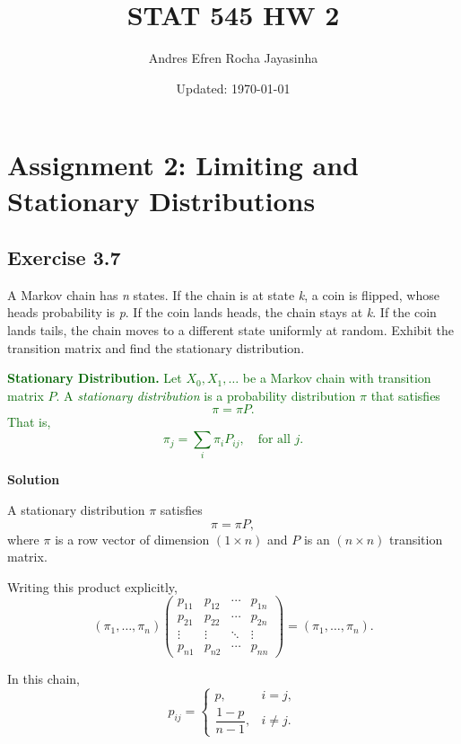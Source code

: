 \documentclass[hidelinks]{article}
\title{\textbf{STAT 545 HW 2}}
\author{Andres Efren Rocha Jayasinha}
\date{Updated: \today} %
\begin{document}
\hypersetup{bookmarksnumbered=true,}
\pagecolor{white}
\color{black}
\maketitle
\begin{Large}
\tableofcontents
\end{Large}%
\pagebreak

\section{Assignment 2: Limiting and Stationary Distributions}

\subsection{Exercise 3.7}
A Markov chain has \textit{n} states. If the chain is at state \textit{k}, a coin is flipped, whose
heads probability is \textit{p}. If the coin lands heads, the chain stays at \textit{k}. If the coin
lands tails, the chain moves to a different state uniformly at random. Exhibit the
transition matrix and find the stationary distribution.

\smallskip

\noindent \textcolor{darkgreen}{
\textbf{Stationary Distribution.}
Let $X_0, X_1, \ldots$ be a Markov chain with transition matrix $P$.
A \emph{stationary distribution} is a probability distribution $\pi$
that satisfies
\[
\pi = \pi P.
\]
That is,
\[
\pi_j = \sum_i \pi_i P_{ij}, \quad \text{for all } j.
\]
}

\noindent \textbf{Solution}

\noindent A stationary distribution $\pi$ satisfies
\[
\pi = \pi P,
\]
where $\pi$ is a row vector of dimension $(1 \times n)$ and $P$ is an $(n \times n)$ transition matrix.

\medskip

\noindent Writing this product explicitly,
\[
(\pi_1,\ldots,\pi_n)
\begin{pmatrix}
p_{11} & p_{12} & \cdots & p_{1n} \\
p_{21} & p_{22} & \cdots & p_{2n} \\
\vdots & \vdots & \ddots & \vdots \\
p_{n1} & p_{n2} & \cdots & p_{nn}
\end{pmatrix}
=
(\pi_1,\ldots,\pi_n).
\]

\noindent In this chain,
\[
p_{ij} =
\begin{cases}
p, & i=j,\\[4pt]
\dfrac{1-p}{n-1}, & i\neq j.
\end{cases}
\]
\end{document}
